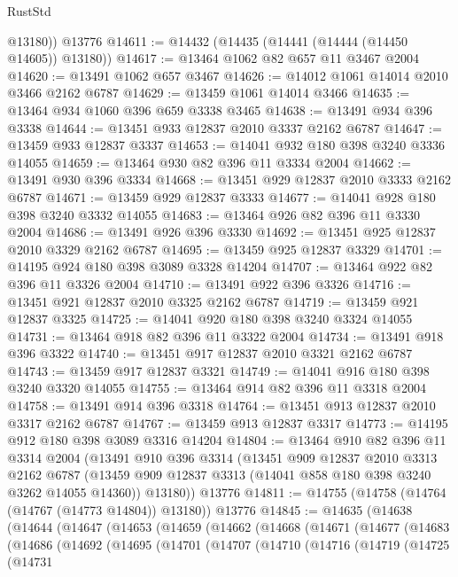 \begin{lexlean}{RustStd}
\begin{coremodule}
{\begin{coremodule}
{{{{{{{{{{{{{{{{{{{{{{{{{{{{{{{        @13180))
    @13776
@14611 := @14432 (@14435 (@14441 (@14444 (@14450 @14605)) @13180))
@14617 := @13464 @1062 @82 @657 @11 @3467 @2004
@14620 := @13491 @1062 @657 @3467
@14626 := @14012 @1061 @14014 @2010 @3466 @2162 @6787
@14629 := @13459 @1061 @14014 @3466
@14635 := @13464 @934 @1060 @396 @659 @3338 @3465
@14638 := @13491 @934 @396 @3338
@14644 := @13451 @933 @12837 @2010 @3337 @2162 @6787
@14647 := @13459 @933 @12837 @3337
@14653 := @14041 @932 @180 @398 @3240 @3336 @14055
@14659 := @13464 @930 @82 @396 @11 @3334 @2004
@14662 := @13491 @930 @396 @3334
@14668 := @13451 @929 @12837 @2010 @3333 @2162 @6787
@14671 := @13459 @929 @12837 @3333
@14677 := @14041 @928 @180 @398 @3240 @3332 @14055
@14683 := @13464 @926 @82 @396 @11 @3330 @2004
@14686 := @13491 @926 @396 @3330
@14692 := @13451 @925 @12837 @2010 @3329 @2162 @6787
@14695 := @13459 @925 @12837 @3329
@14701 := @14195 @924 @180 @398 @3089 @3328 @14204
@14707 := @13464 @922 @82 @396 @11 @3326 @2004
@14710 := @13491 @922 @396 @3326
@14716 := @13451 @921 @12837 @2010 @3325 @2162 @6787
@14719 := @13459 @921 @12837 @3325
@14725 := @14041 @920 @180 @398 @3240 @3324 @14055
@14731 := @13464 @918 @82 @396 @11 @3322 @2004
@14734 := @13491 @918 @396 @3322
@14740 := @13451 @917 @12837 @2010 @3321 @2162 @6787
@14743 := @13459 @917 @12837 @3321
@14749 := @14041 @916 @180 @398 @3240 @3320 @14055
@14755 := @13464 @914 @82 @396 @11 @3318 @2004
@14758 := @13491 @914 @396 @3318
@14764 := @13451 @913 @12837 @2010 @3317 @2162 @6787
@14767 := @13459 @913 @12837 @3317
@14773 := @14195 @912 @180 @398 @3089 @3316 @14204
@14804 := @13464
    @910
    @82
    @396
    @11
    @3314
    @2004
    (@13491
      @910
      @396
      @3314
      (@13451
        @909
        @12837
        @2010
        @3313
        @2162
        @6787
        (@13459 @909 @12837 @3313 (@14041 @858 @180 @398 @3240 @3262 @14055 @14360))
        @13180))
    @13776
@14811 := @14755 (@14758 (@14764 (@14767 (@14773 @14804)) @13180)) @13776
@14845 := @14635
    (@14638
      (@14644
        (@14647
          (@14653
            (@14659
              (@14662
                (@14668
                  (@14671
                    (@14677
                      (@14683
                        (@14686
                          (@14692
                            (@14695
                              (@14701
                                (@14707
                                  (@14710
                                    (@14716
                                      (@14719
                                        (@14725
                                          (@14731
}}}}}}}}}}}}}}}}}}}}}}}}}}}}}}}
\end{coremodule}}
\end{coremodule}
\end{lexlean}
